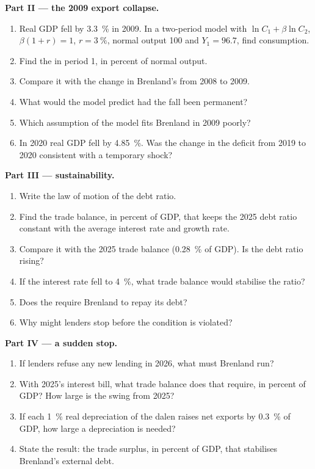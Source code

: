 \begin{problem}
\medskip\noindent\textbf{Part II --- the 2009 export collapse.}
\begin{enumerate}[resume]
\item Real GDP fell by 3.3~\% in 2009. In a two-period model with $\ln C_1 + \beta\ln C_2$,
$\beta(1 + r) = 1$, $r = 3~\%$, normal output 100 and $Y_1 = 96.7$, find consumption.
\item Find the  in period 1, in percent of normal output.
\item Compare it with the change in Brenland's  from 2008 to 2009.
\item What would the model predict had the fall been permanent?
\item Which assumption of the model fits Brenland in 2009 poorly?
\item In 2020 real GDP fell by 4.85~\%. Was the change in the deficit from 2019 to
2020 consistent with a temporary shock?
\end{enumerate}

\medskip\noindent\textbf{Part III --- sustainability.}
\begin{enumerate}[resume]
\item Write the law of motion of the debt ratio.
\item Find the trade balance, in percent of GDP, that keeps the 2025 debt ratio
constant with the average interest rate and growth rate.
\item Compare it with the 2025 trade balance (0.28~\% of GDP). Is the debt ratio
rising?
\item If the interest rate fell to 4~\%, what trade balance would stabilise the
ratio?
\item Does the  require Brenland to repay its debt?
\item Why might lenders stop before the condition is violated?
\end{enumerate}

\medskip\noindent\textbf{Part IV --- a sudden stop.}
\begin{enumerate}[resume]
\item If lenders refuse any new lending in 2026, what  must Brenland
run?
\item With 2025's interest bill, what trade balance does that require, in percent of
GDP? How large is the swing from 2025?
\item If each 1~\% real depreciation of the dalen raises net exports by 0.3~\% of GDP,
how large a depreciation is needed?
\item State the result: the trade surplus, in percent of GDP, that stabilises
Brenland's external debt.
\end{enumerate}
\end{problem}
